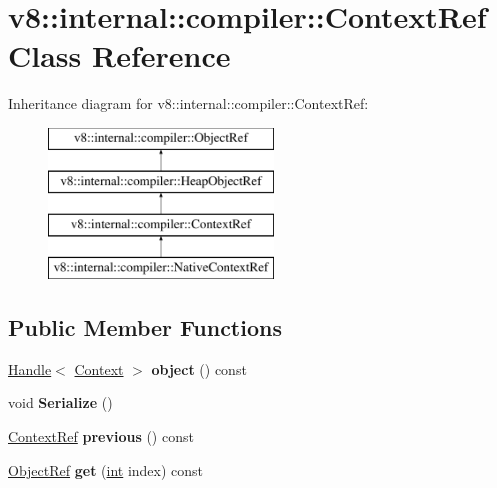 \hypertarget{classv8_1_1internal_1_1compiler_1_1ContextRef}{}\section{v8\+:\+:internal\+:\+:compiler\+:\+:Context\+Ref Class Reference}
\label{classv8_1_1internal_1_1compiler_1_1ContextRef}
Inheritance diagram for v8\+:\+:internal\+:\+:compiler\+:\+:Context\+Ref\+:\begin{figure}[H]
\begin{center}
\leavevmode
\includegraphics[height=4.000000cm]{classv8_1_1internal_1_1compiler_1_1ContextRef}
\end{center}
\end{figure}
\subsection*{Public Member Functions}
\begin{DoxyCompactItemize}
\item 
\mbox{\label{classv8_1_1internal_1_1compiler_1_1ContextRef_ac20f5e820740f187a4af2c8b9fd7846b}} 
\mbox{\hyperlink{classv8_1_1internal_1_1Handle}{Handle}}$<$ \mbox{\hyperlink{classv8_1_1internal_1_1Context}{Context}} $>$ {\bfseries object} () const
\item 
\mbox{\label{classv8_1_1internal_1_1compiler_1_1ContextRef_a73e2694b33dd0e245c0a7d7c204feb0d}} 
void {\bfseries Serialize} ()
\item 
\mbox{\label{classv8_1_1internal_1_1compiler_1_1ContextRef_a90dbddeda852c0e7dd93853335e0bdab}} 
\mbox{\hyperlink{classv8_1_1internal_1_1compiler_1_1ContextRef}{Context\+Ref}} {\bfseries previous} () const
\item 
\mbox{\label{classv8_1_1internal_1_1compiler_1_1ContextRef_abf6c09800371252c41bd7a1cbfd09409}} 
\mbox{\hyperlink{classv8_1_1internal_1_1compiler_1_1ObjectRef}{Object\+Ref}} {\bfseries get} (\mbox{\hyperlink{classint}{int}} index) const
\end{DoxyCompactItemize}
